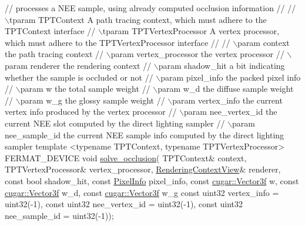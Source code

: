 \begin{DoxyParagraph}{}
\begin{DoxyCode}
\textcolor{comment}{// processes a NEE sample, using already computed occlusion information}
\textcolor{comment}{//}
\textcolor{comment}{// \(\backslash\)tparam TPTContext         A path tracing context, which must adhere to the TPTContext interface}
\textcolor{comment}{// \(\backslash\)tparam TPTVertexProcessor A vertex processor, which must adhere to the TPTVertexProcessor interface}
\textcolor{comment}{//}
\textcolor{comment}{// \(\backslash\)param context                  the path tracing context}
\textcolor{comment}{// \(\backslash\)param vertex\_processor         the vertex processor}
\textcolor{comment}{// \(\backslash\)param renderer                 the rendering context}
\textcolor{comment}{// \(\backslash\)param shadow\_hit               a bit indicating whether the sample is occluded or not}
\textcolor{comment}{// \(\backslash\)param pixel\_info               the packed pixel info}
\textcolor{comment}{// \(\backslash\)param w                        the total sample weight}
\textcolor{comment}{// \(\backslash\)param w\_d                      the diffuse sample weight}
\textcolor{comment}{// \(\backslash\)param w\_g                      the glossy sample weight}
\textcolor{comment}{// \(\backslash\)param vertex\_info              the current vertex info produced by the vertex processor}
\textcolor{comment}{// \(\backslash\)param nee\_vertex\_id            the current NEE slot computed by the direct lighting sampler}
\textcolor{comment}{// \(\backslash\)param nee\_sample\_id            the current NEE sample info computed by the direct lighting sampler}
\textcolor{keyword}{template} <\textcolor{keyword}{typename} TPTContext, \textcolor{keyword}{typename} TPTVertexProcessor>
FERMAT\_DEVICE
\textcolor{keywordtype}{void} \hyperlink{group___b_p_t_lib_core_ga588188b86e2afbe1f62d1bdd7a145cbf}{solve\_occlusion}(
  TPTContext&             context,
  TPTVertexProcessor&     vertex\_processor,
  \hyperlink{struct_rendering_context_view}{RenderingContextView}&   renderer,
  \textcolor{keyword}{const} \textcolor{keywordtype}{bool}              shadow\_hit,
  \textcolor{keyword}{const} \hyperlink{union_pixel_info}{PixelInfo}         pixel\_info,
  \textcolor{keyword}{const} \hyperlink{structcugar_1_1_vector}{cugar::Vector3f}   w,
  \textcolor{keyword}{const} \hyperlink{structcugar_1_1_vector}{cugar::Vector3f}   w\_d,
  \textcolor{keyword}{const} \hyperlink{structcugar_1_1_vector}{cugar::Vector3f}   w\_g
  \textcolor{keyword}{const} uint32            vertex\_info    = uint32(-1),
  \textcolor{keyword}{const} uint32            nee\_vertex\_id  = uint32(-1),
  \textcolor{keyword}{const} uint32            nee\_sample\_id  = uint32(-1));


\end{DoxyCode}
\end{DoxyParagraph}
